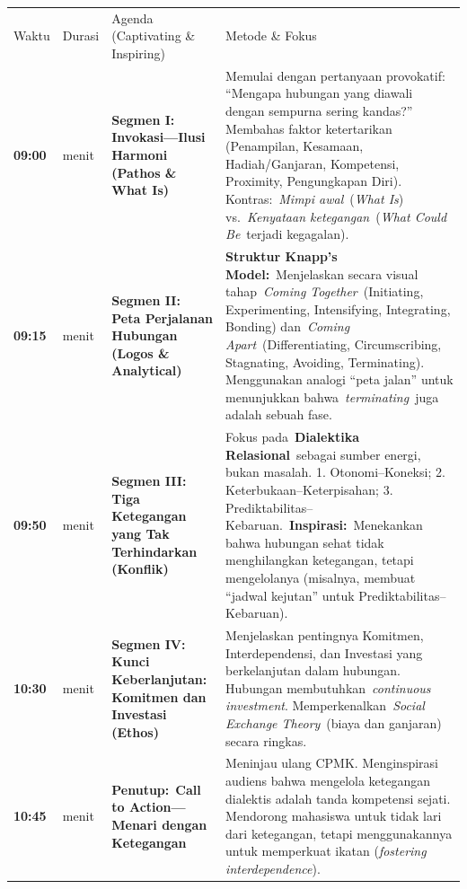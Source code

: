 \documentclass[
  letterpaper,
  DIV=11,
  numbers=noendperiod]{scrreprt}
\begin{document}
\begin{longtable}[]{@{}
  >{\raggedright\arraybackslash}p{}
  >{\raggedright\arraybackslash}p{}
  >{\raggedright\arraybackslash}p{}
  >{\raggedright\arraybackslash}p{}@{}}
\toprule\noalign{}
\endhead
\bottomrule\noalign{}
\endlastfoot
Waktu & Durasi & Agenda (Captivating \& Inspiring) & Metode \& Fokus \\
\textbf{09:00} & 15 menit & \textbf{Segmen I: Invokasi---Ilusi Harmoni
(Pathos \& What Is)} & Memulai dengan pertanyaan provokatif: ``Mengapa
hubungan yang diawali dengan sempurna sering kandas?'' Membahas faktor
ketertarikan (Penampilan, Kesamaan, Hadiah/Ganjaran, Kompetensi,
Proximity, Pengungkapan Diri). Kontras:~\emph{Mimpi awal}~(\emph{What
Is}) vs.~\emph{Kenyataan ketegangan}~(\emph{What Could Be}~terjadi
kegagalan). \\
\textbf{09:15} & 35 menit & \textbf{Segmen II: Peta Perjalanan Hubungan
(Logos \& Analytical)} & \textbf{Struktur Knapp's Model:}~Menjelaskan
secara visual tahap~\emph{Coming Together}~(Initiating, Experimenting,
Intensifying, Integrating, Bonding) dan~\emph{Coming
Apart}~(Differentiating, Circumscribing, Stagnating, Avoiding,
Terminating). Menggunakan analogi ``peta jalan'' untuk menunjukkan
bahwa~\emph{terminating}~juga adalah sebuah fase. \\
\textbf{09:50} & 40 menit & \textbf{Segmen III: Tiga Ketegangan yang Tak
Terhindarkan (Konflik)} & Fokus pada~\textbf{Dialektika
Relasional}~sebagai sumber energi, bukan masalah. 1. Otonomi--Koneksi;
2. Keterbukaan--Keterpisahan; 3.
Prediktabilitas--Kebaruan.~\textbf{Inspirasi:}~Menekankan bahwa hubungan
sehat tidak menghilangkan ketegangan, tetapi mengelolanya (misalnya,
membuat ``jadwal kejutan'' untuk Prediktabilitas--Kebaruan). \\
\textbf{10:30} & 15 menit & \textbf{Segmen IV: Kunci Keberlanjutan:
Komitmen dan Investasi (Ethos)} & Menjelaskan pentingnya Komitmen,
Interdependensi, dan Investasi yang berkelanjutan dalam hubungan.
Hubungan membutuhkan~\emph{continuous investment}.
Memperkenalkan~\emph{Social Exchange Theory}~(biaya dan ganjaran) secara
ringkas. \\
\textbf{10:45} & 15 menit & \textbf{Penutup:}~\textbf{Call to
Action---Menari dengan Ketegangan} & Meninjau ulang CPMK. Menginspirasi
audiens bahwa mengelola ketegangan dialektis adalah tanda kompetensi
sejati. Mendorong mahasiswa untuk tidak lari dari ketegangan, tetapi
menggunakannya untuk memperkuat ikatan (\emph{fostering
interdependence}). \\
\end{longtable}
\end{document}
